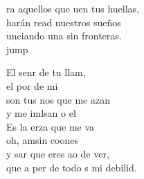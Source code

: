 \begin{cancion}
	ra aquellos que uen tus huellas,\\
	harán read nuestros sueños\\
	unciando una sin fronteras.\\jump\\
	\begin{chorus}%
	El senr de tu llam,\\
	el por de mi\\
	son tus nos que me azan\\
	y me imlsan o el \\
	Es la erza que me va\\
	oh,  amsin coones\\
	y sar que eres ao de ver,\\
	que a per de todo s mi debilid.\\
	\end{chorus}%
	\jump\\
\end{cancion}%
